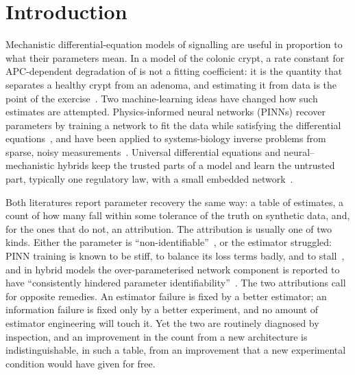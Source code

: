 \section{Introduction}
\label{sec:intro}

Mechanistic differential-equation models of signalling are useful in proportion
to what their parameters mean. In a model of the colonic crypt, a rate constant
for APC-dependent degradation of \bcat{} is not a fitting coefficient: it is the
quantity that separates a healthy crypt from an adenoma, and estimating it from
data is the point of the
exercise~\citep{fearon1990genetic,kinzler1996hereditary,clevers2012wnt}.
Two machine-learning ideas have changed how such estimates are attempted.
Physics-informed neural networks (PINNs) recover parameters by training a
network to fit the data while satisfying the differential
equations~\citep{raissi2019pinn,karniadakis2021piml}, and have been applied to
systems-biology inverse problems from sparse, noisy
measurements~\citep{yazdani2020systems,lagergren2020binns,daneker2023identifiability,ahmadi2024aiaristotle}.
Universal differential equations and neural--mechanistic hybrids keep the
trusted parts of a model and learn the untrusted part, typically one regulatory
law, with a small embedded
network~\citep{rackauckas2020ude,philipps2025ude,giampiccolo2024hnode,derooij2025ude}.

Both literatures report parameter recovery the same way: a table of estimates,
a count of how many fall within some tolerance of the truth on synthetic data,
and, for the ones that do not, an attribution. The attribution is usually one of
two kinds. Either the parameter is ``non-identifiable''~\citep{raue2009identifiability,wieland2021identifiability},
or the estimator struggled: PINN training is known to be stiff, to balance its
loss terms badly, and to stall~\citep{wang2021gradient,wang2022ntk,krishnapriyan2021failure},
and in hybrid models the over-parameterised network component is reported to
have ``consistently hindered parameter identifiability''~\citep{philipps2025ude}. The two
attributions call for opposite remedies. An estimator failure is fixed by a
better estimator; an information failure is fixed only by a better experiment,
and no amount of estimator engineering will touch it. Yet the two are routinely
diagnosed by inspection, and an improvement in the count from a new architecture
is indistinguishable, in such a table, from an improvement that a new
experimental condition would have given for free.

